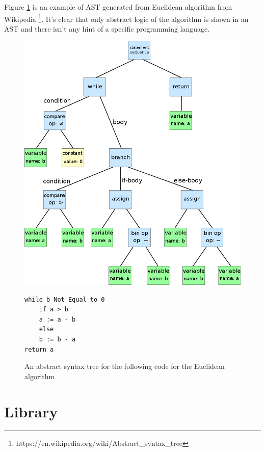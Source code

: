 Figure \ref{fig:AST-example} is an example of AST generated from Euclidean algorithm from Wikipedia \footnote{https://en.wikipedia.org/wiki/Abstract\_syntax\_tree}. It's clear that only abstract logic of the algorithm is shown in an AST and there isn't any hint of a specific programming language.       

\begin{figure}[h!]
  \includegraphics[scale=0.25]{Images/AST.png}
  \caption[An abstract syntax tree for the following code for the Euclidean algorithm:]%
    {An abstract syntax tree for the following code for the Euclidean algorithm}
 
  \begin{verbatim}
while b Not Equal to 0
    if a > b
    a := a - b
    else
    b := b - a
return a
\end{verbatim}
  \label{fig:AST-example}
\end{figure}


\section{Library}
